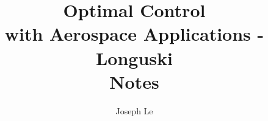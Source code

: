 \documentclass[10pt]{book}
\begin{document}
\title{Optimal Control\\ with Aerospace Applications - Longuski \\
\smallskip
\large Notes}
\author{Joseph Le}
\date{}
\maketitle
\tableofcontents










\end{document}
